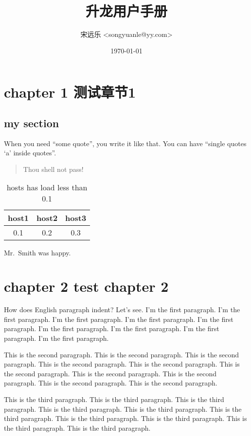 \documentclass[a4paper,10pt]{book}
\title{升龙用户手册}
\author{宋远乐 <songyuanle@yy.com>}
\date{\today}
\begin{document}
\maketitle
\tableofcontents
\chapter{chapter 1 测试章节1}
\section{my section}
When you need ``some quote'', you write it like that.
You can have ``single quotes `a' inside quotes''.

\begin{quote}
  Thou shell not pass!
\end{quote}
\begin{table}[htp]
  \label{table:host-load}
  \caption{hosts has load less than 0.1}
  \begin{tabular}{|c|c|c|}
    \hline
    host1 & host2 & host3 \\
    \hline
    0.1 & 0.2 & 0.3 \\
    \hline
  \end{tabular}
\end{table}

Mr.~Smith was happy.

\chapter{chapter 2 test chapter 2}

How does English paragraph indent? Let's see. I'm the first paragraph. I'm the first paragraph. I'm the first paragraph. I'm the first paragraph. I'm the first paragraph. I'm the first paragraph. I'm the first paragraph. I'm the first paragraph. I'm the first paragraph.

This is the second paragraph. This is the second paragraph. This is the second paragraph. This is the second paragraph. This is the second paragraph. This is the second paragraph. This is the second paragraph. This is the second paragraph. This is the second paragraph. This is the second paragraph. 

This         is the third paragraph. This         is the third paragraph. This         is the third paragraph. This         is the third paragraph. This         is the third paragraph. This         is the third paragraph. This         is the third paragraph. This         is the third paragraph. This         is the third paragraph. This         is the third paragraph. 
\end{document}
